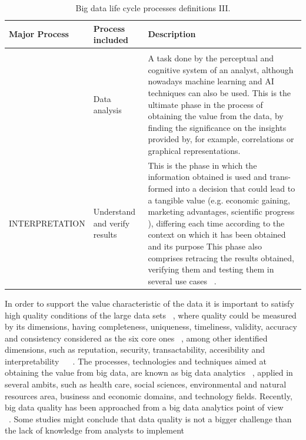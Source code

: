 \begin{table}[H]
	\caption{Big data life cycle processes definitions III.}
	\label{table:big_data_life_cyle_processes_definition_III}
	\centering
	\begin{tabular}{p{4.0cm} p{3.1cm} p{7cm}}
		\toprule
		\textbf{Major Process} & \textbf{Process included} & \textbf{Description} \\ 
		\bottomrule   
		& \\ & Data analysis & A task done by the perceptual and
		cognitive system of an analyst, although nowadays machine learning
		and AI techniques can also be used. This is the ultimate phase in the process of obtaining the value from the
		data, by finding the significance on the insights provided by, for example,
		correlations or graphical representations. ~\cite{Ware2012}
		\\
		INTERPRETATION & Understand and verify results & This is the phase in which the information obtained is used and trans-
		formed into a decision that could lead
		to a tangible value (e.g. economic gaining, marketing advantages, scientific progress ), differing each time
		according to the context on which it has been obtained and its purpose This phase also comprises retracing
		the results obtained, verifying them and testing them in several use cases
		~\cite{ComputingResearchAssociation}.
		\\
		\bottomrule
	\end{tabular}
\end{table}

In order to support the value characteristic of the data it is important to satisfy
high quality conditions of the large data sets ~\cite{ZhuCai2015}, where quality could be measured
by its dimensions, having completeness, uniqueness, timeliness, validity, accuracy and
consistency considered as the six core ones ~\cite{DAMA2013}, among other identified dimensions,
such as reputation, security, transactability, accesibility and interpretability ~\cite{Pipino2002} ~\cite{McGilvary2008}.
The processes, technologies and techniques aimed at obtaining the value from big
data, are known as big data analytics ~\cite{Kwon2014}, applied in several ambits, such as health
care, social sciences, environmental and natural resources area, business and economic
domains, and technology fields. Recently, big data quality has been approached from a
big data analytics point of view ~\cite{Kambatla2014} ~\cite{Hazen2014} ~\cite{Lavalle2011}. Some studies might conclude that data
quality is not a bigger challenge than the lack of knowledge from analysts to implement 

